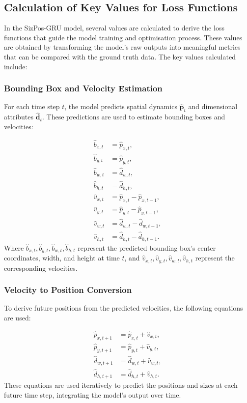 \documentclass[12pt,oneside]{book} %
\begin{document}
\subsection{Calculation of Key Values for Loss Functions}
\noindent In the SizPos-GRU model, several values are calculated to derive the loss
functions that guide the model training and optimisation process. These values
are obtained by transforming the model's raw outputs into meaningful metrics
that can be compared with the ground truth data. The key values calculated
include:

\subsubsection*{Bounding Box and Velocity Estimation}
\noindent For each time step \(t\), the model predicts spatial dynamics \(\hat{\mathbf{p}}_t\) and dimensional attributes \(\hat{\mathbf{d}}_t\). These predictions are used to estimate bounding boxes and velocities:

\begin{align}
    \hat{b}_{x,t} & = \hat{p}_{x,t},                    \\
    \hat{b}_{y,t} & = \hat{p}_{y,t},                    \\
    \hat{b}_{w,t} & = \hat{d}_{w,t},                    \\
    \hat{b}_{h,t} & = \hat{d}_{h,t},                    \\
    \hat{v}_{x,t} & = \hat{p}_{x,t} - \hat{p}_{x,t-1},  \\
    \hat{v}_{y,t} & = \hat{p}_{y,t} - \hat{p}_{y,t-1},  \\
    \hat{v}_{w,t} & = \hat{d}_{w,t} - \hat{d}_{w,t-1},  \\
    \hat{v}_{h,t} & = \hat{d}_{h,t} - \hat{d}_{h,t-1}.
\end{align}
Where \(\hat{b}_{x,t}, \hat{b}_{y,t}, \hat{b}_{w,t}, \hat{b}_{h,t}\) represent
the predicted bounding box's center coordinates, width, and height at time
\(t\), and \(\hat{v}_{x,t}, \hat{v}_{y,t}, \hat{v}_{w,t}, \hat{v}_{h,t}\)
represent the corresponding velocities.

\subsubsection*{Velocity to Position Conversion}
\noindent To derive future positions from the predicted velocities, the following equations are used:

\begin{align}
    \hat{p}_{x,t+1} & = \hat{p}_{x,t} + \hat{v}_{x,t},  \\
    \hat{p}_{y,t+1} & = \hat{p}_{y,t} + \hat{v}_{y,t},  \\
    \hat{d}_{w,t+1} & = \hat{d}_{w,t} + \hat{v}_{w,t},  \\
    \hat{d}_{h,t+1} & = \hat{d}_{h,t} + \hat{v}_{h,t}.
\end{align}
These equations are used iteratively to predict the positions and sizes at each
future time step, integrating the model's output over time.
\end{document}
